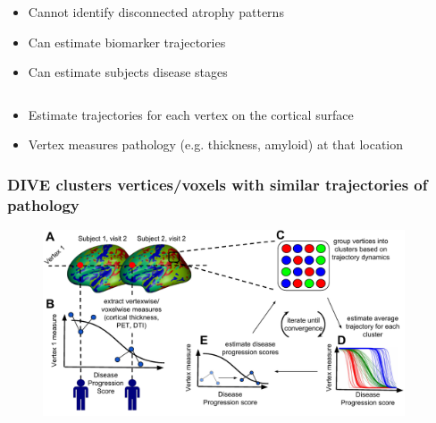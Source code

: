 \begin{frame}
\begin{columns}[T]
\begin{column}{.47\textwidth}
\begin{center}
  \begin{itemize}
   \item Cannot identify disconnected atrophy patterns \no
   \item Can estimate biomarker trajectories \yes
   \item Can estimate subjects disease stages \yes
  \end{itemize}

  
  \end{center}
  \end{column}
\end{columns}

\vspace{1.5em}

\begin{itemize}
  \item Estimate trajectories for each vertex on the cortical surface
  \item Vertex measures pathology (e.g. thickness, amyloid) at that location
\end{itemize}


\end{frame}



\begin{frame}[label=current]
\frametitle{DIVE clusters vertices/voxels with similar trajectories of pathology}

\begin{figure}
\centering
\includegraphics[height=5.5cm]{vwdpm_diagram.pdf}
\end{figure}

    
\end{frame}



